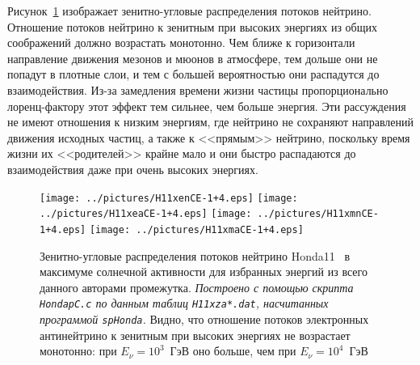 \clearpage
Рисунок~\ref{Honda11maxCE-1+4} изображает зенитно-угловые распределения потоков нейтрино. \textsf{Отношение потоков нейтрино к зенитным при высоких энергиях из общих соображений должно возрастать монотонно. Чем ближе к горизонтали направление движения мезонов и мюонов в атмосфере, тем дольше они не попадут в плотные слои, и тем с большей вероятностью они распадутся до взаимодействия. Из-за замедления времени жизни частицы пропорционально лоренц-фактору этот эффект тем сильнее, чем больше энергия. Эти рассуждения не имеют отношения к низким энергиям, где нейтрино не сохраняют направлений движения исходных частиц, а также к <<прямым>> нейтрино, поскольку время жизни их <<родителей>> крайне мало и они быстро распадаются до взаимодействия даже при очень высоких энергиях.} 
\begin{figure}[!ht]
\texttt{[image: ../pictures/H11xenCE-1+4.eps]}
\texttt{[image: ../pictures/H11xeaCE-1+4.eps]}
\texttt{[image: ../pictures/H11xmnCE-1+4.eps]}
\texttt{[image: ../pictures/H11xmaCE-1+4.eps]}
\caption{Зенитно-угловые распределения потоков нейтрино Honda11~\cite{Honda:2011nf} в максимуме солнечной активности для избранных энергий из всего данного авторами промежутка. \textit{Построено с помощью скрипта \texttt{HondapC.c} по данным таблиц \texttt{H11xza*.dat}, насчитанных программой \texttt{spHonda}.} Видно, что отношение потоков электронных антинейтрино к зенитным при высоких энергиях не возрастает монотонно: при $E_{\nu}=10^{3}$~ГэВ оно больше, чем при $E_{\nu}=10^{4}$~ГэВ}
\label{Honda11maxCE-1+4}
\end{figure}

